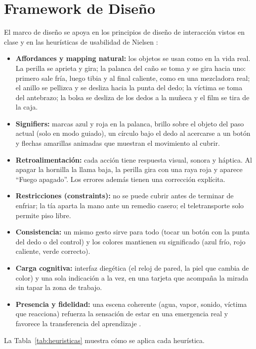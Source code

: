 \documentclass[11pt,a4paper]{article}
\begin{document}
\section{Framework de Diseño}\label{sec:framework}
El marco de diseño se apoya en los principios de diseño de interacción vistos en clase \cite{norman2013} y en las heurísticas de usabilidad de Nielsen \cite{nielsen1994}:
\begin{itemize}
    \item \textbf{Affordances y mapping natural:} los objetos se usan como en la vida real. La perilla se aprieta y gira; la palanca del caño se toma y se gira hacia uno: primero sale fría, luego tibia y al final caliente, como en una mezcladora real; el anillo se pellizca y se desliza hacia la punta del dedo; la víctima se toma del antebrazo; la bolsa se desliza de los dedos a la muñeca y el film se tira de la caja.
    \item \textbf{Signifiers:} marcas azul y roja en la palanca, brillo sobre el objeto del paso actual (solo en modo guiado), un círculo bajo el dedo al acercarse a un botón y flechas amarillas animadas que muestran el movimiento al cubrir.
    \item \textbf{Retroalimentación:} cada acción tiene respuesta visual, sonora y háptica. Al apagar la hornilla la llama baja, la perilla gira con una raya roja y aparece ``Fuego apagado''. Los errores además tienen una corrección explícita.
    \item \textbf{Restricciones (constraints):} no se puede cubrir antes de terminar de enfriar; la tía aparta la mano ante un remedio casero; el teletransporte solo permite piso libre.
    \item \textbf{Consistencia:} un mismo gesto sirve para todo (tocar un botón con la punta del dedo o del control) y los colores mantienen su significado (azul frío, rojo caliente, verde correcto).
    \item \textbf{Carga cognitiva:} interfaz diegética (el reloj de pared, la piel que cambia de color) y una sola indicación a la vez, en una tarjeta que acompaña la mirada sin tapar la zona de trabajo.
    \item \textbf{Presencia y fidelidad:} una escena coherente (agua, vapor, sonido, víctima que reacciona) refuerza la sensación de estar en una emergencia real y favorece la transferencia del aprendizaje \cite{slater1997}.
\end{itemize}

La Tabla~\ref{tab:heuristicas} muestra cómo se aplica cada heurística.
\end{document}
